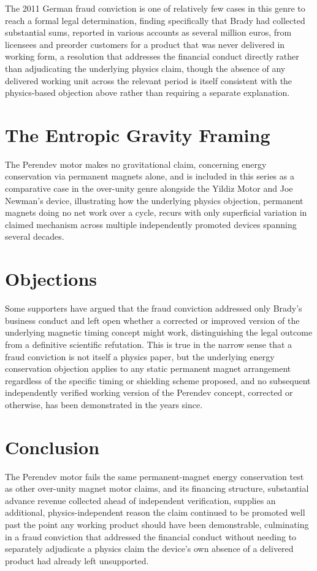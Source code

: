 \documentclass[11pt]{article}
\begin{document}
The 2011 German fraud conviction is one of relatively few cases in this genre to reach a formal legal determination, finding specifically that Brady had collected substantial sums, reported in various accounts as several million euros, from licensees and preorder customers for a product that was never delivered in working form, a resolution that addresses the financial conduct directly rather than adjudicating the underlying physics claim, though the absence of any delivered working unit across the relevant period is itself consistent with the physics-based objection above rather than requiring a separate explanation.

\section{The Entropic Gravity Framing}

The Perendev motor makes no gravitational claim, concerning energy conservation via permanent magnets alone, and is included in this series as a comparative case in the over-unity genre alongside the Yildiz Motor and Joe Newman's device, illustrating how the underlying physics objection, permanent magnets doing no net work over a cycle, recurs with only superficial variation in claimed mechanism across multiple independently promoted devices spanning several decades.

\section{Objections}

Some supporters have argued that the fraud conviction addressed only Brady's business conduct and left open whether a corrected or improved version of the underlying magnetic timing concept might work, distinguishing the legal outcome from a definitive scientific refutation. This is true in the narrow sense that a fraud conviction is not itself a physics paper, but the underlying energy conservation objection applies to any static permanent magnet arrangement regardless of the specific timing or shielding scheme proposed, and no subsequent independently verified working version of the Perendev concept, corrected or otherwise, has been demonstrated in the years since.

\section{Conclusion}

The Perendev motor fails the same permanent-magnet energy conservation test as other over-unity magnet motor claims, and its financing structure, substantial advance revenue collected ahead of independent verification, supplies an additional, physics-independent reason the claim continued to be promoted well past the point any working product should have been demonstrable, culminating in a fraud conviction that addressed the financial conduct without needing to separately adjudicate a physics claim the device's own absence of a delivered product had already left unsupported.
\end{document}
